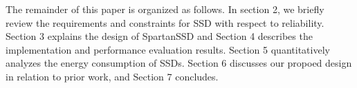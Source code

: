 The remainder of this paper is organized as follows. In section 2, we briefly review the 
requirements and constraints for SSD with respect to reliability. Section 3 explains the 
design of SpartanSSD and Section 4 describes the implementation and performance evaluation results. 
Section 5 quantitatively analyzes the energy consumption of SSDs. Section 6 discusses our propoed design 
in relation to prior work, and Section 7 concludes. 

